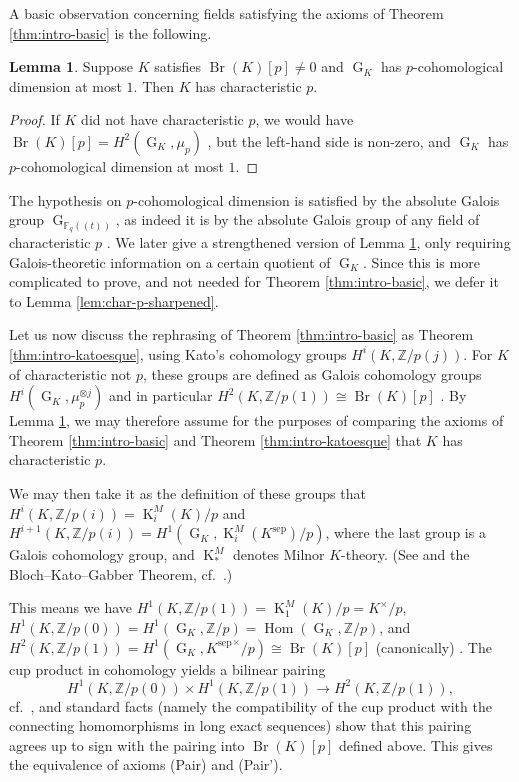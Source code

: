 \documentclass[a4paper, british, oneside]{amsart}
\newcommand{\Z}{\mathbb{Z}}
\newcommand{\F}{\mathbb{F}}
\DeclareMathOperator{\G}{G}
\DeclareMathOperator{\Br}{Br}
\DeclareMathOperator{\Hom}{Hom}
\newcommand{\pow}[1]{(\!(#1)\!)}
\newcommand{\KM}{\operatorname{K}^M}
\theoremstyle{definition}
\newtheorem{lemma}[theorem]{Lemma}
\theoremstyle{remark}
\begin{document}
A basic observation concerning fields satisfying the axioms of Theorem \ref{thm:intro-basic} is the following.
\begin{lemma}\label{lem:char-p}
  Suppose $K$ satisfies $\Br(K)[p] \neq 0$ and $\G_K$ has $p$-cohomological dimension at most $1$.
  Then $K$ has characteristic $p$.
\end{lemma}
\begin{proof}
  If $K$ did not have characteristic $p$, we would have $\Br(K)[p] = H^2(\G_K, \mu_p)$ \cite[Corollary 4.4.5]{GilleSzamuely_2nd}, but the left-hand side is non-zero, and $\G_K$ has $p$-cohomological dimension at most $1$.
\end{proof}
The hypothesis on $p$-cohomological dimension is satisfied by the absolute Galois group $\G_{\F_q\pow{t}}$,
as indeed it is by the absolute Galois group of any field of characteristic $p$ \cite[Corollary 6.1.3]{NSW}.
We later give a strengthened version of Lemma \ref{lem:char-p}, only requiring Galois-theoretic information on a certain quotient of $\G_K$.
Since this is more complicated to prove, and not needed for Theorem \ref{thm:intro-basic},
we defer it to Lemma \ref{lem:char-p-sharpened}.


Let us now discuss the rephrasing of Theorem \ref{thm:intro-basic} as Theorem \ref{thm:intro-katoesque}, using Kato's cohomology groups $H^i(K, \Z/p(j))$.
For $K$ of characteristic not $p$, these groups are defined as Galois cohomology groups $H^i(\G_K, \mu_p^{\otimes j})$ and in particular $H^2(K, \Z/p(1)) \cong \Br(K)[p]$ \cite[p.~143]{Kato_HassePrinciple}.
By Lemma \ref{lem:char-p}, we may therefore assume for the purposes of comparing the axioms of Theorem \ref{thm:intro-basic} and Theorem \ref{thm:intro-katoesque} that $K$ has characteristic $p$.

We may then take it as the definition of these groups that $H^i(K, \Z/p(i)) = \KM_i(K)/p$ and $H^{i+1}(K, \Z/p(i)) = H^1(\G_K, \KM_i(K^{\mathrm{sep}})/p)$, where the last group is a Galois cohomology group, and $\KM_\ast$ denotes Milnor $K$-theory.
(See \cite[Appendix A, p.~152]{GaribaldiMerkurjevSerre_RostInvariants} and the Bloch--Kato--Gabber Theorem, cf.\ \cite[p.~149, (1.2.1)]{Kato_HassePrinciple}.)

This means we have $H^1(K, \Z/p(1)) = \KM_1(K)/p = K^\times/p$,
$H^1(K, \Z/p(0)) = H^1(\G_K, \Z/p) = \Hom(\G_K, \Z/p)$, and $H^2(K, \Z/p(1)) = H^1(\G_K, {K^{\mathrm{sep}}}^\times/p) \cong \Br(K)[p]$ (canonically) \cite[Appendix A, Example A.3~(2)]{GaribaldiMerkurjevSerre_RostInvariants}.
The cup product in cohomology yields a bilinear pairing
\[ H^1(K, \Z/p(0)) \times H^1(K, \Z/p(1)) \to H^2(K, \Z/p(1)) ,\]
cf.\ \cite[Appendix A, (A.5)]{GaribaldiMerkurjevSerre_RostInvariants},
and standard facts
(namely the compatibility of the cup product with the connecting homomorphisms in long exact sequences)
show that this pairing agrees up to sign with the pairing into $\Br(K)[p]$ defined above.
This gives the equivalence of axioms (Pair) and (Pair').
\end{document}
